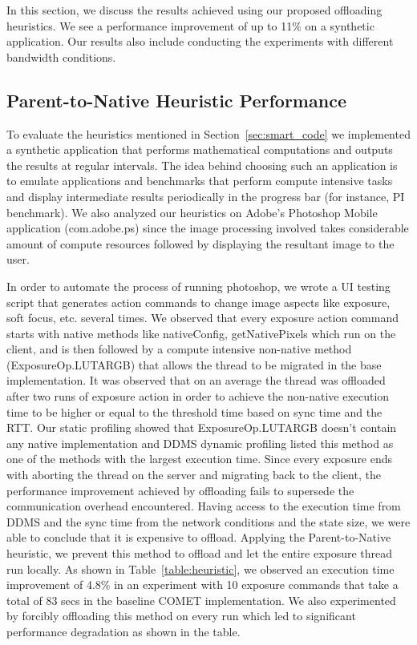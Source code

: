 In this section, we discuss the results achieved using our proposed offloading heuristics. We see a performance improvement
of up to 11\% on a synthetic application. Our results also include conducting the experiments with different bandwidth conditions.
\subsection{Parent-to-Native Heuristic Performance}
To evaluate the heuristics mentioned in Section~\ref{sec:smart_code} we implemented a synthetic application that performs mathematical computations and outputs the results at regular intervals. The idea behind choosing such an application is to emulate applications and benchmarks that perform compute intensive tasks and display intermediate results periodically in the progress bar (for instance, PI benchmark). We also analyzed our heuristics on Adobe's Photoshop Mobile application
(com.adobe.ps) since the image processing involved takes considerable amount of compute resources followed by displaying the resultant image to the user.

In order to automate the process of running photoshop, we wrote a UI testing script that generates action commands to change image aspects like exposure, soft focus, etc. several times. We observed that every exposure action command starts with native methods like nativeConfig, getNativePixels which run on the client, and is then followed by a compute intensive non-native method  (ExposureOp.LUTARGB) that allows the thread to be migrated in the base implementation. It was observed that on an average the thread was offloaded after two runs of exposure action in order to achieve the non-native execution time to be higher or equal to the threshold time based on sync time and the RTT. Our static profiling showed that ExposureOp.LUTARGB doesn't contain any native implementation and DDMS dynamic profiling listed this method as one of the methods with the largest execution time. Since every exposure ends with aborting the thread on the server and migrating back to the client, the performance improvement achieved by offloading fails to supersede the communication overhead encountered. Having access to the execution time from DDMS and the sync time from the network conditions and the state size, we were able to conclude that it is expensive to offload. Applying the Parent-to-Native heuristic, we prevent this method to offload and let the entire exposure thread run locally. As shown in Table~\ref{table:heuristic}, we observed an execution time improvement of 4.8\% in an experiment with 10 exposure commands that take a total of 83 secs in the baseline COMET implementation.  We also experimented by forcibly offloading this method on every run which led to significant performance degradation as shown in the table.

